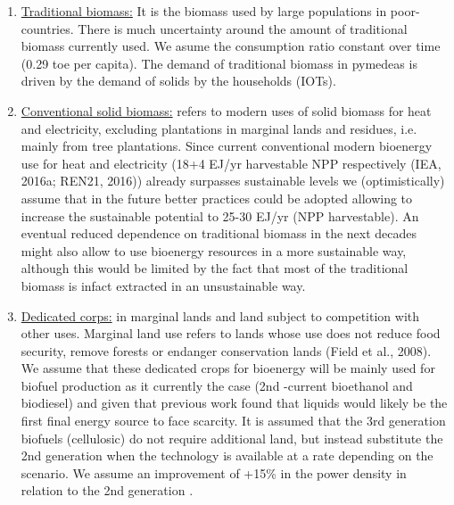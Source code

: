 \begin{enumerate}
    \item \underline{Traditional biomass:} It is the biomass used by large populations in poor-countries. There is much uncertainty around the amount of traditional biomass currently used. We asume the consumption ratio constant over time (0.29 toe per capita). The demand of traditional biomass in pymedeas is driven by the demand of solids by the households (IOTs).
    \item \underline{Conventional solid biomass:} refers to modern uses of solid biomass for heat and electricity, excluding plantations in marginal lands and residues, i.e. mainly from tree plantations. Since current conventional modern bioenergy use for heat and electricity (18+4 EJ/yr harvestable NPP respectively (IEA, 2016a; REN21, 2016)) already surpasses sustainable levels we (optimistically) assume that in the future better practices could be adopted allowing to increase the sustainable potential to 25-30 EJ/yr (NPP harvestable). An eventual reduced dependence on traditional biomass in the next decades might also allow to use bioenergy resources in a more sustainable way, although this would be limited by the fact that most of the traditional biomass is infact extracted in an unsustainable way.
    \item \underline{Dedicated corps:} in marginal lands and land subject to competition with other uses. Marginal land use refers to lands whose use does not reduce food security, remove forests or endanger conservation lands (Field et al., 2008). We assume that these dedicated crops for bioenergy will be mainly used for biofuel production as it currently the case (2nd -current bioethanol and biodiesel) and given that previous work found that liquids would likely be the first final energy source to face scarcity. It is assumed that the 3rd generation biofuels (cellulosic) do not require additional land, but instead substitute the 2nd generation when the technology is available at a rate depending on the scenario. We assume an improvement of +15\% in the power density in relation to the 2nd generation \cite{WBGU2009}.

\end{enumerate}
